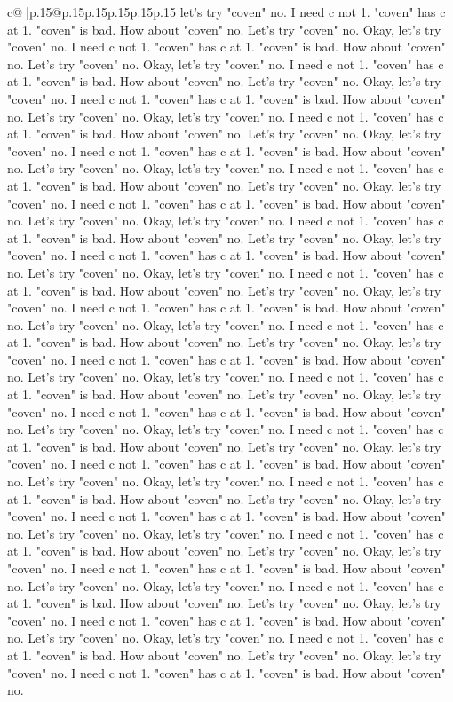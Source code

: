 \documentclass{article}
\begin{document}
{\begin{supertabular}{c@{$\;$}|p{.15\linewidth}@{}p{.15\linewidth}p{.15\linewidth}p{.15\linewidth}p{.15\linewidth}p{.15\linewidth}}
{{{let's try "coven" no. I need c not 1. "coven" has c at 1. "coven" is bad. How about "coven" no. Let's try "coven" no. Okay, let's try "coven" no. I need c not 1. "coven" has c at 1. "coven" is bad. How about "coven" no. Let's try "coven" no. Okay, let's try "coven" no. I need c not 1. "coven" has c at 1. "coven" is bad. How about "coven" no. Let's try "coven" no. Okay, let's try "coven" no. I need c not 1. "coven" has c at 1. "coven" is bad. How about "coven" no. Let's try "coven" no. Okay, let's try "coven" no. I need c not 1. "coven" has c at 1. "coven" is bad. How about "coven" no. Let's try "coven" no. Okay, let's try "coven" no. I need c not 1. "coven" has c at 1. "coven" is bad. How about "coven" no. Let's try "coven" no. Okay, let's try "coven" no. I need c not 1. "coven" has c at 1. "coven" is bad. How about "coven" no. Let's try "coven" no. Okay, let's try "coven" no. I need c not 1. "coven" has c at 1. "coven" is bad. How about "coven" no. Let's try "coven" no. Okay, let's try "coven" no. I need c not 1. "coven" has c at 1. "coven" is bad. How about "coven" no. Let's try "coven" no. Okay, let's try "coven" no. I need c not 1. "coven" has c at 1. "coven" is bad. How about "coven" no. Let's try "coven" no. Okay, let's try "coven" no. I need c not 1. "coven" has c at 1. "coven" is bad. How about "coven" no. Let's try "coven" no. Okay, let's try "coven" no. I need c not 1. "coven" has c at 1. "coven" is bad. How about "coven" no. Let's try "coven" no. Okay, let's try "coven" no. I need c not 1. "coven" has c at 1. "coven" is bad. How about "coven" no. Let's try "coven" no. Okay, let's try "coven" no. I need c not 1. "coven" has c at 1. "coven" is bad. How about "coven" no. Let's try "coven" no. Okay, let's try "coven" no. I need c not 1. "coven" has c at 1. "coven" is bad. How about "coven" no. Let's try "coven" no. Okay, let's try "coven" no. I need c not 1. "coven" has c at 1. "coven" is bad. How about "coven" no. Let's try "coven" no. Okay, let's try "coven" no. I need c not 1. "coven" has c at 1. "coven" is bad. How about "coven" no. Let's try "coven" no. Okay, let's try "coven" no. I need c not 1. "coven" has c at 1. "coven" is bad. How about "coven" no. Let's try "coven" no. Okay, let's try "coven" no. I need c not 1. "coven" has c at 1. "coven" is bad. How about "coven" no. Let's try "coven" no. Okay, let's try "coven" no. I need c not 1. "coven" has c at 1. "coven" is bad. How about "coven" no. Let's try "coven" no. Okay, let's try "coven" no. I need c not 1. "coven" has c at 1. "coven" is bad. How about "coven" no. Let's try "coven" no. Okay, let's try "coven" no. I need c not 1. "coven" has c at 1. "coven" is bad. How about "coven" no. Let's try "coven" no. Okay, let's try "coven" no. I need c not 1. "coven" has c at 1. "coven" is bad. How about "coven" no. Let's try "coven" no. Okay, let's try "coven" no. I need c not 1. "coven" has c at 1. "coven" is bad. How about "coven" no. Let's try "coven" no. Okay, let's try "coven" no. I need c not 1. "coven" has c at 1. "coven" is bad. How about "coven" no. Let's try "coven" no. Okay, let's try "coven" no. I need c not 1. "coven" has c at 1. "coven" is bad. How about "coven" no. }}}
\end{supertabular}}
\end{document}
